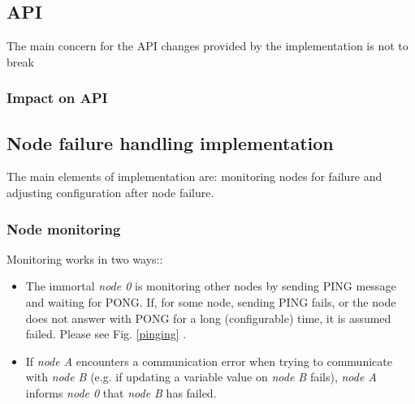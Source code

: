 \documentclass{llncs}
\begin{document}

\subsection{API}
The main concern for the API changes provided by the implementation is not to break

\subsubsection{Impact on API}

\subsection{Node failure handling implementation}

The main elements of implementation are: monitoring nodes for failure and adjusting configuration after node failure.

\subsubsection{Node monitoring}
Monitoring works in two ways::
\begin{itemize}
\item The immortal \textit{node 0} is monitoring other nodes by sending PING message and waiting for PONG.
If, for some node, sending PING fails, or the node does not answer with PONG for a long (configurable) time,
it is assumed failed. Please see Fig. \ref{pinging} .
\item
If \textit{node A} encounters a communication error when trying to communicate with \textit{node B}
(e.g. if updating a variable value on \textit{node B} fails), \textit{node A} informs \textit{node 0} that \textit{node B} has failed.

\end{itemize}
\end{document}
